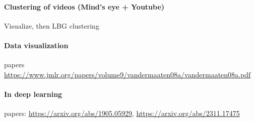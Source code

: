 \paragraph{Clustering of videos (Mind's eye + Youtube)}
Visualize, then LBG clustering


\paragraph{Data visualization}
papers \url{https://www.jmlr.org/papers/volume9/vandermaaten08a/vandermaaten08a.pdf}


\paragraph{In deep learning}
papers: \url{https://arxiv.org/abs/1905.05929}, \url{https://arxiv.org/abs/2311.17475}



